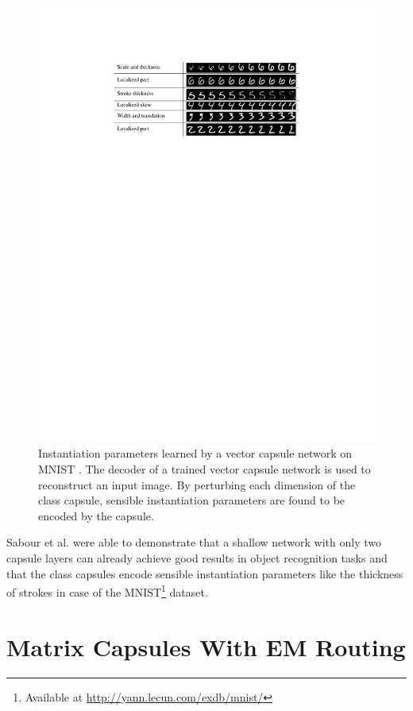 \begin{figure}
    \centering
    \includegraphics[width=.75\textwidth]{figures/vector-capsules-parameters.pdf}
\caption[Instantiation parameters learned by a vector capsule network on MNIST]{Instantiation parameters learned by a vector capsule network on MNIST \cite{sabour2017dynamic}. The decoder of a trained vector capsule network is used to reconstruct an input image. By perturbing each dimension of the class capsule, sensible instantiation parameters are found to be encoded by the capsule. }\label{fig:vector-capsules-parameters}
\end{figure}\noindent
Sabour et al. were able to demonstrate that a shallow network with only two capsule layers can already achieve good results in object recognition tasks and that the class capsules encode sensible instantiation parameters like the thickness of strokes in case of the MNIST\footnote{Available at \url{http://yann.lecun.com/exdb/mnist/}} dataset.
\section{Matrix Capsules With EM Routing}